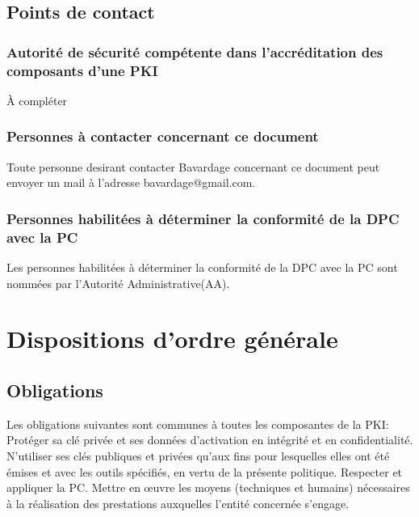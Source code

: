 \documentclass[a4paper,11pt,french]{book}
\begin{document}
\subsection{Points de contact}
\subsubsection{Autorité de sécurité compétente dans l'accréditation des composants d'une PKI}
		À compléter
		
\subsubsection{Personnes à contacter concernant ce document}		
Toute personne desirant contacter Bavardage concernant ce document peut envoyer un mail à l'adresse bavardage@gmail.com.

\subsubsection{Personnes habilitées à déterminer la conformité de la DPC avec la PC}

Les personnes habilitées à déterminer la conformité de la DPC avec la PC sont nommées par l’Autorité Administrative(AA).

\section{Dispositions d'ordre générale}
\subsection{Obligations}
Les obligations suivantes sont communes à toutes les composantes de la PKI:
Protéger sa clé privée et ses données d’activation en intégrité et en confidentialité.
N’utiliser ses clés publiques et privées qu’aux fins pour lesquelles elles ont été émises et avec les outils spécifiés, en vertu de la présente politique.
Respecter et appliquer la PC.
Mettre en œuvre les moyens (techniques et humains) nécessaires à la réalisation des prestations auxquelles l’entité concernée s’engage.
\end{document}
